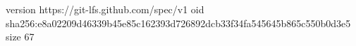 version https://git-lfs.github.com/spec/v1
oid sha256:e8a02209d46339b45e85c162393d726892dcb33f34fa545645b865c550b0d3e5
size 67
